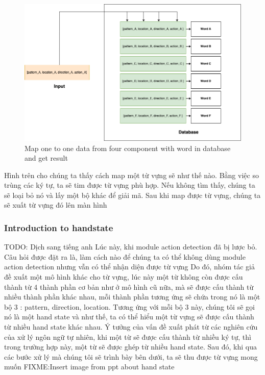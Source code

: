    \begin{figure}[H]
      \centering
      \includegraphics[width=\textwidth]{img/Chap4/MapWord.png}
      \caption{Map one to one data from four component with word in database and get result}
      \label{fig:Chap4-MapWord}
    \end{figure}

    Hình trên cho chúng ta thấy cách map một từ vựng sẽ như thế nào.
    Bằng việc so trùng các ký tự, ta sẽ tim được từ vựng phù hợp.
    Nếu không tìm thấy, chúng ta sẽ loại bỏ nó và lấy một bộ khác
    để giải mã.
    Sau khi map được từ vựng, chúng ta sẽ xuất từ vựng đó lên màn hình
    \subsubsection{ Introduction to handstate }
      TODO: Dịch sang tiếng anh
      Lúc này, khi module action detection đã bị lược bỏ. Câu hỏi được đặt ra là,
      làm cách nào để chúng ta có thể không dùng module action detection nhưng vẫn có thể
      nhận diện được từ vựng
      Do đó, nhóm tác giả đề xuất một mô hình khác cho từ vựng, lúc này
      một từ không còn được cấu thành từ 4 thành phần cơ bản như ở mô hình cũ nữa,
      mà sẽ được cấu thành từ nhiều thành phần khác nhau, mỗi thành phần tương ứng
      sẽ chứa trong nó là một bộ 3 : pattern, direction, location. Tương ứng với mỗi
      bộ 3 này, chúng tôi sẽ gọi nó là một hand state và như thế, ta có thể hiểu một từ vựng
      sẽ được cấu thành từ nhiều hand state khác nhau. Ý tưởng của vấn đề xuất phát
      từ các nghiên cứu của xử lý ngôn ngữ tự nhiên, khi một từ sẽ được cấu thành từ
      nhiều ký tự, thì trong trường hợp này, một từ sẽ được ghép từ nhiều hand state.
      Sau đó, khi qua các bước xử lý mà chúng tôi sẽ trình bày bên dưới, ta sẽ thu được từ vựng mong muốn
      FIXME:Insert image from ppt about hand state

